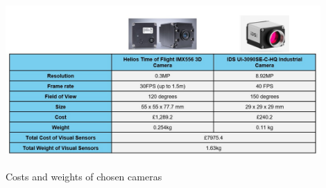 \documentclass[11pt]{article}		%
\newcommand{\supercite}[1]{\textsuperscript{\cite{#1}}}		%
\begin{document}
				\begin{table}[H]
			  		\centering
			  		\includegraphics[width=0.9\textwidth]{cameracosts.jpg}
					\caption{Costs and weights of chosen cameras\supercite{camera}\supercite{camera2}}
					\label{cameracost}
				\end{table}
		
\end{document}
